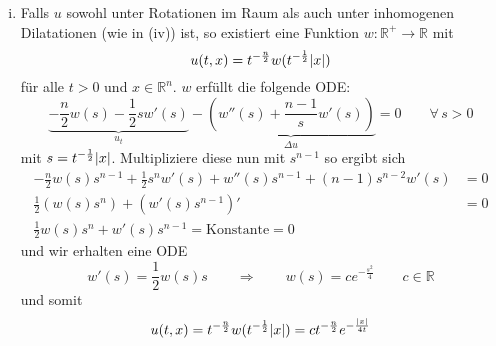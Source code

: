 \begin{enumerate}[(i)]
	\item Falls $u$ sowohl unter Rotationen im Raum als auch unter inhomogenen Dilatationen (wie in (iv)) ist, so existiert eine Funktion $w: \mathbb{R}^+ \to \mathbb{R}$ mit
	\[
		u(t,x)= t^{- \frac{n}{2}} w(t^{- \frac{1}{2}} \lvert x\rvert)
	\]
	für alle $t >0$ und $x \in \mathbb{R}^n$. $w$ erfüllt die folgende ODE:
	\[
		\underset{u_t}{\underbrace{-\frac{n}{2} w(s)- \frac{1}{2} s w'(s)}} - \underset{\Delta u}{\underbrace{\left( w''(s) + \frac{n-1}{s} w'(s) \right)}} 
		= 0 \qquad \forall\, s >0 
	\]
	mit $s = t^{- \frac{1}{2}} \lvert x\rvert$. Multipliziere diese nun mit $s^{n-1}$ so ergibt sich
	\begin{align*}
		- \frac{n}{2} w(s) s^{n-1} + \frac{1}{2} s^n w'(s) + w''(s) s^{n-1} + (n-1) s^{n-2} w'(s) &= 0 \\
		\frac{1}{2} \left( w(s) s^n \right) + \left( w'(s) s^{n-1} \right)' &=0  \\
		\frac{1}{2} w(s) s^n + w'(s) s^{n-1} = \text{Konstante} = 0
	\end{align*}
	und wir erhalten eine ODE
	\[
		w'(s) = \frac{1}{2}w(s)s \qquad \Rightarrow \qquad w(s) = c e^{-\frac{s^2}{4}} \qquad c \in \mathbb{R}
	\]
	und somit
	\[
		u(t,x) = t^{- \frac{n}{2}} w(t^{- \frac{1}{2}} \lvert x\rvert) = c t^{- \frac{n}{2}} e^{- \frac{\lvert x\rvert}{4t}}
	\]
\end{enumerate}

